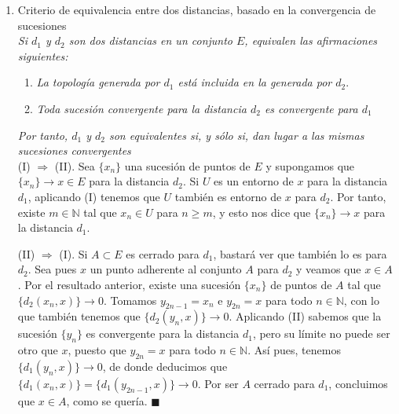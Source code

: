 \documentclass[a4paper, 12pt]{article}
\begin{document}
\begin{enumerate}[label=\textbf{\arabic*}.]
\begin{enumerate}[label=\textit{\alph*})]
\bigskip

	\item Criterio de equivalencia entre dos distancias, basado en la convergencia de sucesiones \\
	
\hspace{1cm} \textit{Si \(d_1\) y \(d_2\) son dos distancias en un conjunto \(E\), equivalen las afirmaciones siguientes:}
	\begin{enumerate}[label=(\roman*).]
    \item \textit{La topología generada por \(d_1\) está incluida en la generada por \(d_2\)}.
    
    \item \textit{Toda sucesión convergente para la distancia \(d_2\) es convergente para \(d_1\)}
	\end{enumerate}

\textit{Por tanto, \(d_1\) y \(d_2\) son equivalentes si, y sólo si, dan lugar a las mismas sucesiones convergentes} \\

(I) \(\Rightarrow\) (II). Sea \(\{x_n\}\) una sucesión de puntos de \(E\) y supongamos que \(\{x_n\} \rightarrow x \in E\) para la distancia \(d_2\). Si \(U\) es un entorno de \(x\) para la distancia \(d_1\), aplicando (I) tenemos que \(U\) también es entorno de \(x\) para \(d_2\). Por tanto, existe \(m \in \mathbb{N}\) tal que \(x_n \in U\) para \(n \geq m\), y esto nos dice que \(\{ x_n \} \rightarrow x\) para la distancia \(d_1\).

(II) \(\Rightarrow\) (I). Si \(A \subset E\) es cerrado para \(d_1\), bastará ver que también lo es para \(d_2\). Sea pues \(x\) un punto adherente al conjunto \(A\) para \(d_2\) y veamos que \(x \in A\). Por el resultado anterior, existe una sucesión \(\{x_n\}\) de puntos de \(A\) tal que \(\{d_2(x_n,x)\} \rightarrow 0\). Tomamos \(y_{2n-1} = x_n\) e \(y_{2n} = x\) para todo \(n \in \mathbb{N}\), con lo que también tenemos que \(\{d_2(y_n,x)\} \rightarrow 0\). Aplicando (II) sabemos que la sucesión \(\{y_n\}\) es convergente para la distancia \(d_1\), pero su límite no puede ser otro que \(x\), puesto que \(y_{2n} = x\) para todo \(n \in \mathbb{N}\). Así pues, tenemos \(\{d_1(y_n,x)\} \rightarrow 0\), de donde deducimos que \(\{d_1(x_n, x)\} = \{d_1(y_{2n-1},x)\} \rightarrow 0\). Por ser \(A\) cerrado para \(d_1\), concluimos que \(x \in A\), como se quería. \hspace{11.7cm} \(\blacksquare\)

	\end{enumerate}


\end{enumerate}
\end{document}
